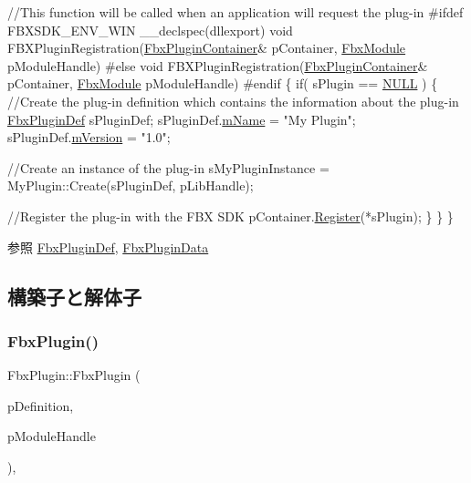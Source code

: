 \begin{DoxyCode}
    \textcolor{comment}{//This function will be called when an application will request the plug-in}
\textcolor{preprocessor}{#ifdef FBXSDK\_ENV\_WIN}
    \_\_declspec(dllexport) \textcolor{keywordtype}{void} FBXPluginRegistration(\hyperlink{class_fbx_plugin_container}{FbxPluginContainer}& pContainer, 
      \hyperlink{fbxmodule_8h_a1d2ed3e9ccb8075d585f7cb7bdf40420}{FbxModule} pModuleHandle)
\textcolor{preprocessor}{#else}
    \textcolor{keywordtype}{void} FBXPluginRegistration(\hyperlink{class_fbx_plugin_container}{FbxPluginContainer}& pContainer, 
      \hyperlink{fbxmodule_8h_a1d2ed3e9ccb8075d585f7cb7bdf40420}{FbxModule} pModuleHandle)
\textcolor{preprocessor}{#endif}
    \{
        \textcolor{keywordflow}{if}( sPlugin == \hyperlink{fbxarch_8h_a070d2ce7b6bb7e5c05602aa8c308d0c4}{NULL} )
        \{
            \textcolor{comment}{//Create the plug-in definition which contains the information about the plug-in}
            \hyperlink{struct_fbx_plugin_def}{FbxPluginDef} sPluginDef;
            sPluginDef.\hyperlink{struct_fbx_plugin_def_ac98378284bf666cbba614e9121ba7189}{mName} = \textcolor{stringliteral}{"My Plugin"};
            sPluginDef.\hyperlink{struct_fbx_plugin_def_aeea048adb24ec74cb906df076bedf21d}{mVersion} = \textcolor{stringliteral}{"1.0"};

            \textcolor{comment}{//Create an instance of the plug-in}
            sMyPluginInstance = MyPlugin::Create(sPluginDef, pLibHandle);

            \textcolor{comment}{//Register the plug-in with the FBX SDK}
            pContainer.\hyperlink{class_fbx_plugin_container_a3fc28ffe0296973afb3014112b4b0df0}{Register}(*sPlugin);
        \}
    \}
\}
\end{DoxyCode}
 \begin{DoxySeeAlso}{参照}
\hyperlink{struct_fbx_plugin_def}{Fbx\+Plugin\+Def}, \hyperlink{struct_fbx_plugin_data}{Fbx\+Plugin\+Data} 
\end{DoxySeeAlso}


\subsection{構築子と解体子}
\mbox{\label{class_fbx_plugin_ab9ee11bcfcbc81e8fa9696f113e03181}} 
\subsubsection{\texorpdfstring{Fbx\+Plugin()}{FbxPlugin()}}
{\footnotesize\ttfamily Fbx\+Plugin\+::\+Fbx\+Plugin (\begin{DoxyParamCaption}\item[{const \hyperlink{struct_fbx_plugin_def}{Fbx\+Plugin\+Def} \&}]{p\+Definition,  }\item[{\hyperlink{fbxmodule_8h_a1d2ed3e9ccb8075d585f7cb7bdf40420}{Fbx\+Module}}]{p\+Module\+Handle }\end{DoxyParamCaption})\hspace{0.3cm}{\ttfamily [explicit]}, {\ttfamily [protected]}}

